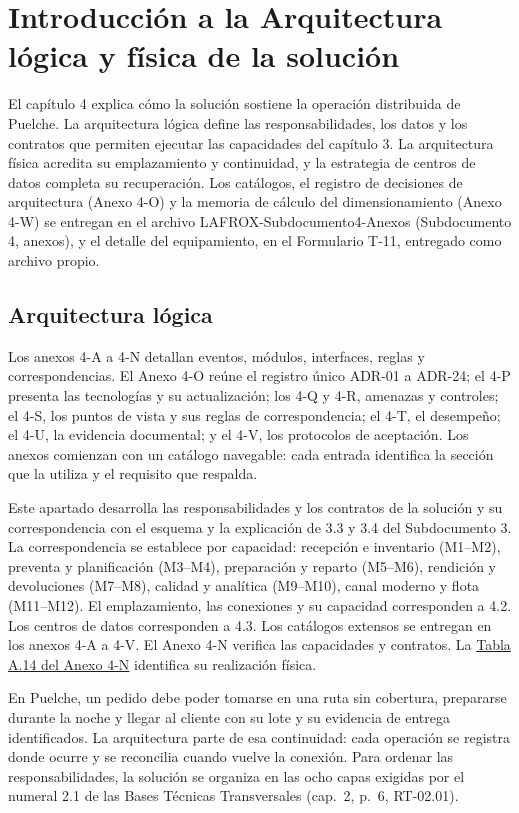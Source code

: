 
\chapter{Introducción a la Arquitectura lógica y física de la solución}
\label{cap:arquitectura-logica}

El capítulo 4 explica cómo la solución sostiene la operación distribuida de Puelche. La arquitectura lógica define las responsabilidades, los datos y los contratos que permiten ejecutar las capacidades del capítulo 3. La arquitectura física acredita su emplazamiento y continuidad, y la estrategia de centros de datos completa su recuperación. Los catálogos, el registro de decisiones de arquitectura (Anexo 4-O) y la memoria de cálculo del dimensionamiento (Anexo 4-W) se entregan en el archivo LAFROX-Subdocumento4-Anexos (Subdocumento 4, anexos), y el detalle del equipamiento, en el Formulario T-11, entregado como archivo propio.

\section{Arquitectura lógica}
\label{sec:arquitectura-logica}

Los anexos 4-A a 4-N detallan eventos, módulos, interfaces, reglas y correspondencias. El Anexo 4-O reúne el registro único ADR-01 a ADR-24; el 4-P presenta las tecnologías y su actualización; los 4-Q y 4-R, amenazas y controles; el 4-S, los puntos de vista y sus reglas de correspondencia; el 4-T, el desempeño; el 4-U, la evidencia documental; y el 4-V, los protocolos de aceptación. Los anexos comienzan con un catálogo navegable: cada entrada identifica la sección que la utiliza y el requisito que respalda.

Este apartado desarrolla las responsabilidades y los contratos de la solución y su correspondencia con el esquema y la explicación de 3.3 y 3.4 del Subdocumento 3. La correspondencia se establece por capacidad: recepción e inventario (M1--M2), preventa y planificación (M3--M4), preparación y reparto (M5--M6), rendición y devoluciones (M7--M8), calidad y analítica (M9--M10), canal moderno y flota (M11--M12). El emplazamiento, las conexiones y su capacidad corresponden a 4.2. Los centros de datos corresponden a 4.3. Los catálogos extensos se entregan en los anexos 4-A a 4-V. El Anexo 4-N verifica las capacidades y contratos. La \href{LAFROX-Subdocumento4-Anexos.pdf#tab:mapeo-logica}{Tabla A.14 del Anexo 4-N} identifica su realización física.

En Puelche, un pedido debe poder tomarse en una ruta sin cobertura, prepararse durante la noche y llegar al cliente con su lote y su evidencia de entrega identificados. La arquitectura parte de esa continuidad: cada operación se registra donde ocurre y se reconcilia cuando vuelve la conexión. Para ordenar las responsabilidades, la solución se organiza en las ocho capas exigidas por el numeral 2.1 de las Bases Técnicas Transversales (cap.~2, p.~6, RT-02.01).
